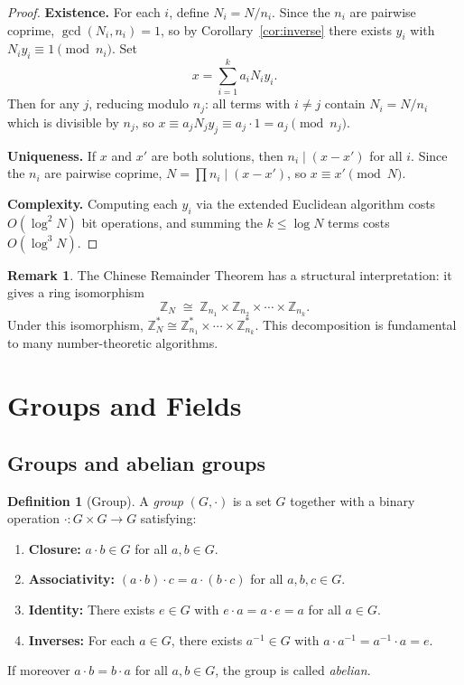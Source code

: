 \documentclass[twoside,12pt]{book}
\theoremstyle{plain}
\theoremstyle{definition}
\newtheorem{definition}[theorem]{Definition}
\newtheorem{remark}[theorem]{Remark}
\theoremstyle{remark}
\begin{document}
\begin{proof}
\textbf{Existence.} For each $i$, define $N_i = N / n_i$. Since the $n_i$ are pairwise coprime, $\gcd(N_i, n_i) = 1$, so by Corollary~\ref{cor:inverse} there exists $y_i$ with $N_i y_i \equiv 1 \pmod{n_i}$. Set
\[
x = \sum_{i=1}^{k} a_i N_i y_i.
\]
Then for any $j$, reducing modulo $n_j$: all terms with $i \neq j$ contain $N_i = N / n_i$ which is divisible by $n_j$, so $x \equiv a_j N_j y_j \equiv a_j \cdot 1 = a_j \pmod{n_j}$.

\textbf{Uniqueness.} If $x$ and $x'$ are both solutions, then $n_i \mid (x - x')$ for all $i$. Since the $n_i$ are pairwise coprime, $N = \prod n_i \mid (x - x')$, so $x \equiv x' \pmod{N}$.

\textbf{Complexity.} Computing each $y_i$ via the extended Euclidean algorithm costs $O(\log^2 N)$ bit operations, and summing the $k \leq \log N$ terms costs $O(\log^3 N)$.
\end{proof}

\begin{remark}
The Chinese Remainder Theorem has a structural interpretation: it gives a ring isomorphism
\[
\mathbb{Z}_N \;\cong\; \mathbb{Z}_{n_1} \times \mathbb{Z}_{n_2} \times \cdots \times \mathbb{Z}_{n_k}.
\]
Under this isomorphism, $\mathbb{Z}_N^* \cong \mathbb{Z}_{n_1}^* \times \cdots \times \mathbb{Z}_{n_k}^*$. This decomposition is fundamental to many number-theoretic algorithms.
\end{remark}

\section{Groups and Fields}
\label{sec:groups-fields}

\subsection{Groups and abelian groups}

\begin{definition}[Group]
A \emph{group} $(G, \cdot)$ is a set $G$ together with a binary operation $\cdot : G \times G \to G$ satisfying:
\begin{enumerate}[nosep]
    \item \textbf{Closure:} $a \cdot b \in G$ for all $a, b \in G$.
    \item \textbf{Associativity:} $(a \cdot b) \cdot c = a \cdot (b \cdot c)$ for all $a, b, c \in G$.
    \item \textbf{Identity:} There exists $e \in G$ with $e \cdot a = a \cdot e = a$ for all $a \in G$.
    \item \textbf{Inverses:} For each $a \in G$, there exists $a^{-1} \in G$ with $a \cdot a^{-1} = a^{-1} \cdot a = e$.
\end{enumerate}
If moreover $a \cdot b = b \cdot a$ for all $a, b \in G$, the group is called \emph{abelian}.
\end{definition}
\end{document}
